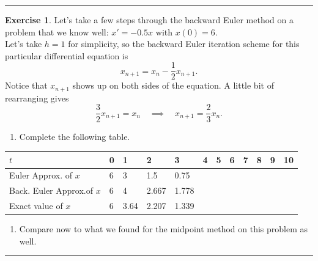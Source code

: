 \documentclass[
]{book}
\providecommand{\tightlist}{%
  \setlength{\itemsep}{0pt}\setlength{\parskip}{0pt}}
\theoremstyle{definition}
\theoremstyle{definition}
\theoremstyle{definition}
\newtheorem{exercise}{Exercise}[chapter]
\theoremstyle{remark}
\begin{document}
\begin{center}\rule{0.5\linewidth}{0.5pt}\end{center}

\begin{exercise}
\protect\hypertarget{exr:unnamed-chunk-470}{}{\label{exr:unnamed-chunk-470} }Let's take a few steps through the backward Euler method on a problem
that we know well: \(x' = -0.5x\) with \(x(0) = 6\).\\
Let's take \(h=1\) for simplicity, so the backward Euler iteration scheme
for this particular differential equation is
\[x_{n+1} = x_n - \frac{1}{2} x_{n+1}.\] Notice that \(x_{n+1}\) shows up
on both sides of the equation. A little bit of rearranging gives
\[\frac{3}{2} x_{n+1} = x_n \quad \implies \quad x_{n+1} = \frac{2}{3} x_n.\]

\begin{enumerate}
\def\labelenumi{\alph{enumi}.}
\tightlist
\item
  Complete the following table.
\end{enumerate}

\begin{longtable}[]{@{}llllllllllll@{}}
\toprule
\(t\) & 0 & 1 & 2 & 3 & 4 & 5 & 6 & 7 & 8 & 9 & 10\tabularnewline
\midrule
\endhead
Euler Approx. of \(x\) & 6 & 3 & 1.5 & 0.75 & & & & & & &\tabularnewline
Back. Euler Approx.of \(x\) & 6 & 4 & 2.667 & 1.778 & & & & & & &\tabularnewline
Exact value of \(x\) & 6 & 3.64 & 2.207 & 1.339 & & & & & & &\tabularnewline
\bottomrule
\end{longtable}

\begin{enumerate}
\def\labelenumi{\alph{enumi}.}
\setcounter{enumi}{1}
\tightlist
\item
  Compare now to what we found for the midpoint method on this problem as well.
\end{enumerate}
\end{exercise}

\begin{center}\rule{0.5\linewidth}{0.5pt}\end{center}
\end{document}
